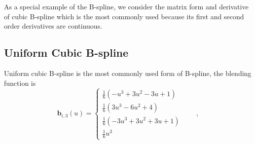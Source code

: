 As a special example of the B-spline, we consider the matrix form and
derivative of cubic B-spline which is the most commonly used because
its first and second order derivatives are continuous.





\subsection{Uniform Cubic B-spline}
\label{sec:uqb}
Uniform cubic B-spline is the most commonly used form of B-spline, 
the blending function is
\begin{equation}
  \label{eq:4.6}
  \mathbf{b}_{i,3}(u) = \begin{cases} \frac{1}{6}(-u^3+3u^2-3u+1) \\
    \frac{1}{6}(3u^3 -6u^2+4)\\ \frac{1}{6}(-3u^3+3u^2+3u+1) \\
    \frac{1}{6}u^3
   \end{cases}\qquad ,
\end{equation}


